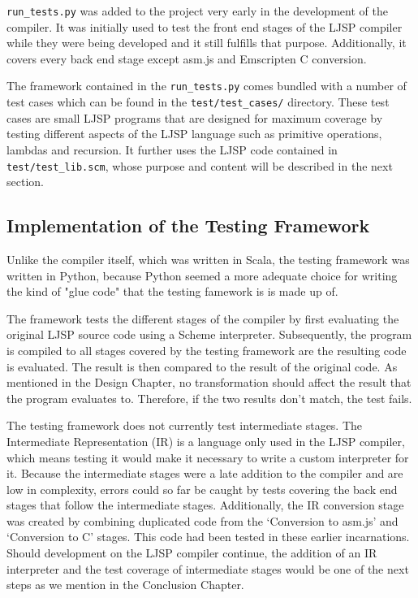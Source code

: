 \documentclass[11pt]{report}
\begin{document}
\texttt{run_tests.py} was added to the project very early in the development of the compiler. It was initially used to test the front end stages of the LJSP compiler while they were being developed and it still fulfills that purpose. Additionally, it covers every back end stage except asm.js and Emscripten C conversion.

The framework contained in the \texttt{run_tests.py} comes bundled with a number of test cases which can be found in the \texttt{test/test_cases/} directory. These test cases are small LJSP programs that are designed for maximum coverage by testing different aspects of the LJSP language such as primitive operations, lambdas and recursion. It further uses the LJSP code contained in \texttt{test/test_lib.scm}, whose purpose and content will be described in the next section.

\subsection{Implementation of the Testing Framework}
Unlike the compiler itself, which was written in Scala, the testing framework was written in Python, because Python seemed a more adequate choice for writing the kind of "glue code" that the testing famework is is made up of. 

The framework tests the different stages of the compiler by first evaluating the original LJSP source code using a Scheme interpreter. Subsequently, the program is compiled to all stages covered by the testing framework are the resulting code is evaluated. The result is then compared to the result of the original code. As mentioned in the Design Chapter, no transformation should affect the result that the program evaluates to. Therefore, if the two results don't match, the test fails.

The testing framework does not currently test intermediate stages. The Intermediate Representation (IR) is a language only used in the LJSP compiler, which means testing it would make it necessary to write a custom interpreter for it. Because the intermediate stages were a late addition to the compiler and are low in complexity, errors could so far be caught by tests covering the back end stages that follow the intermediate stages. Additionally, the IR conversion stage was created by combining duplicated code from the `Conversion to asm.js' and `Conversion to C' stages. This code had been tested in these earlier incarnations. Should development on the LJSP compiler continue, the addition of an IR interpreter and the test coverage of intermediate stages would be one of the next steps as we mention in the Conclusion Chapter.
\end{document}
